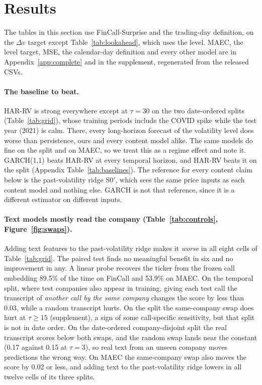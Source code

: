 \section{Results}
\label{sec:results}

The tables in this section use FinCall-Surprise and the trading-day definition,
on the $\Delta v$ target except Table~\ref{tab:lookahead}, which uses the level. MAEC, the level target, MSE, the calendar-day definition
and every other model are in Appendix~\ref{app:complete} and in the supplement,
regenerated from the released CSVs.



\paragraph{The baseline to beat.}
HAR-RV is strong everywhere except at $\tau{=}30$ on the two date-ordered splits
(Table~\ref{tab:grid}), whose training periods include the COVID spike while the
test year (2021) is calm. There, every long-horizon forecast of the volatility
level does worse than persistence, ours and every content model alike. The same
models do fine on the \tickerdisjoint{} split and on MAEC, so we treat this as a
regime effect and note it. GARCH(1,1) beats HAR-RV at every temporal horizon,
and HAR-RV beats it on the \tickerdisjoint{} split (Appendix
Table~\ref{tab:baselines}). The reference for every content claim below
is the past-volatility ridge S0$'$, which sees the same price inputs as each
content model and nothing else. GARCH is not that reference, since it is a
different estimator on different inputs.

\paragraph{Text models mostly read the company (Table~\ref{tab:controls}, Figure~\ref{fig:swaps}).}
Adding text features to the past-volatility ridge makes it \emph{worse} in all
eight cells of Table~\ref{tab:grid}. The paired test finds no meaningful benefit
in six and no improvement in any. A linear probe recovers the ticker from the
frozen call embedding 89.5\% of the time on FinCall and 53.9\% on MAEC. On the
temporal split, where test companies also appear in training, giving each test
call the transcript of \emph{another call by the same company} changes the score
by less than 0.03, while a random transcript hurts. On the \tickerdisjoint{}
split the same-company swap does hurt at $\tau\ge15$ (supplement), a sign of
some call-specific sensitivity, but that split is not in date order. On the
date-ordered company-disjoint split the real transcript scores below both swaps,
and the random swap lands near the constant (0.17 against 0.15 at $\tau{=}3$),
so real text from an unseen company moves predictions the wrong way. On MAEC the same-company swap
also moves the score by 0.02 or less, and adding text to the past-volatility
ridge lowers \Rtwo{} in all twelve cells of its three splits.

